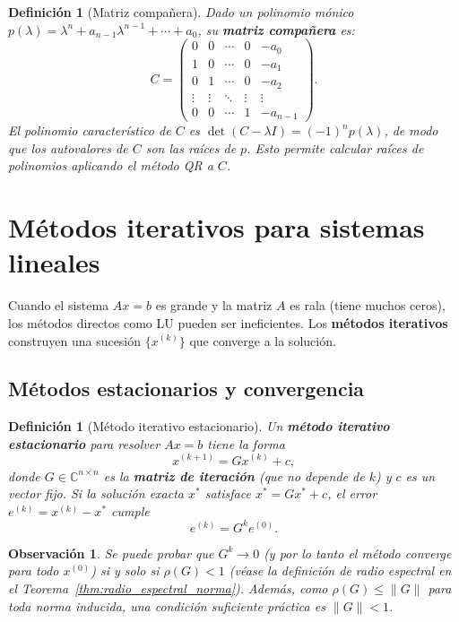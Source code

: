 \documentclass[a4paper,11pt]{report}
\newtheorem{definition}[theorem]{Definición}
\newtheorem{remark}[theorem]{Observación}
\begin{document}
\begin{definition}[Matriz compañera]
Dado un polinomio mónico $p(\lambda) = \lambda^n + a_{n-1}\lambda^{n-1} + \cdots + a_0$, su \textbf{matriz compañera} es:
\[
C = \begin{pmatrix}
0 & 0 & \cdots & 0 & -a_0 \\
1 & 0 & \cdots & 0 & -a_1 \\
0 & 1 & \cdots & 0 & -a_2 \\
\vdots & \vdots & \ddots & \vdots & \vdots \\
0 & 0 & \cdots & 1 & -a_{n-1}
\end{pmatrix}.
\]
El polinomio característico de $C$ es $\det(C - \lambda I) = (-1)^n p(\lambda)$, de modo que los autovalores de $C$ son las raíces de $p$. Esto permite calcular raíces de polinomios aplicando el método QR a $C$.
\end{definition}


\section{Métodos iterativos para sistemas lineales}

Cuando el sistema $Ax = b$ es grande y la matriz $A$ es rala (tiene muchos ceros), los métodos directos como LU pueden ser ineficientes. Los \textbf{métodos iterativos} construyen una sucesión $\{x^{(k)}\}$ que converge a la solución.

\subsection{Métodos estacionarios y convergencia}

\begin{definition}[Método iterativo estacionario]
Un \textbf{método iterativo estacionario} para resolver $Ax = b$ tiene la forma
\[
x^{(k+1)} = G x^{(k)} + c,
\]
donde $G \in \mathbb{C}^{n \times n}$ es la \textbf{matriz de iteración} (que no depende de $k$) y $c$ es un vector fijo. Si la solución exacta $x^*$ satisface $x^* = Gx^* + c$, el error $e^{(k)} = x^{(k)} - x^*$ cumple
\[
e^{(k)} = G^k e^{(0)}.
\]
\end{definition}

\begin{remark}
Se puede probar que $G^k \to 0$ (y por lo tanto el método converge para todo $x^{(0)}$) si y solo si $\rho(G) < 1$ (véase la definición de radio espectral en el Teorema~\ref{thm:radio_espectral_norma}). Además, como $\rho(G) \leq \|G\|$ para toda norma inducida, una condición suficiente práctica es $\|G\| < 1$.
\end{remark}
\end{document}
